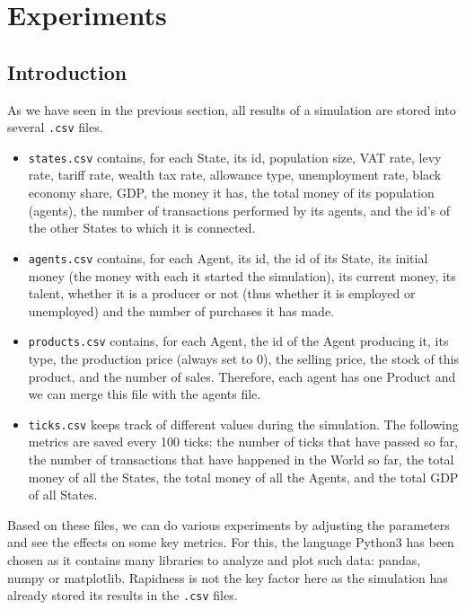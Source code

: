 \chapter{Experiments}\label{chap:Experiments}


\section{Introduction}

As we have seen in the previous section, all results of a simulation are stored into several \texttt{.csv} files.

\begin{itemize}
    \item \texttt{states.csv} contains, for each State, its id, population size, VAT rate, levy rate, tariff rate, wealth tax rate, allowance type, unemployment rate, black economy share, GDP, the money it has, the total money of its population (agents), the number of transactions performed by its agents, and the id's of the other States to which it is connected.

    \item \texttt{agents.csv} contains, for each Agent, its id, the id of its State, its initial money (the money with each it started the simulation), its current money, its talent, whether it is a producer or not (thus whether it is employed or unemployed) and the number of purchases it has made.
    
    \item \texttt{products.csv} contains, for each Agent, the id of the Agent producing it, its type, the production price (always set to 0), the selling price, the stock of this product, and the number of sales. Therefore, each agent has one Product and we can merge this file with the agents file.
    
    \item \texttt{ticks.csv} keeps track of different values during the simulation. The following metrics are saved every 100 ticks: the number of ticks that have passed so far, the number of transactions that have happened in the World so far, the total money of all the States, the total money of all the Agents, and the total GDP of all States.
\end{itemize}

Based on these files, we can do various experiments by adjusting the parameters and see the effects on some key metrics. For this, the language Python3 has been chosen as it contains many libraries to analyze and plot such data: pandas, numpy or matplotlib. Rapidness is not the key factor here as the simulation has already stored its results in the \texttt{.csv} files.

